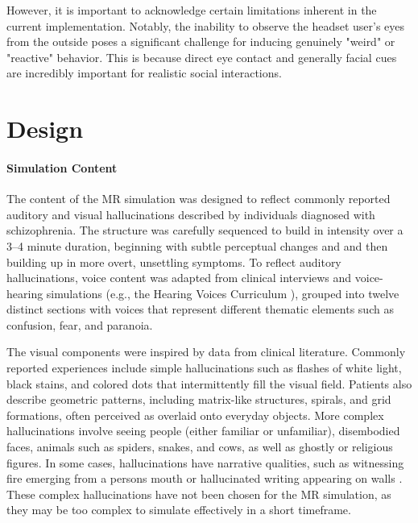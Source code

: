 However, it is important to acknowledge certain limitations inherent in the current implementation. Notably, the inability to observe the headset user's eyes from the outside poses a significant challenge for inducing genuinely "weird" or "reactive" behavior. This is because direct eye contact and generally facial cues are incredibly important for realistic social interactions.

\section{Design}

\paragraph{Simulation Content} The content of the MR simulation was designed to reflect commonly reported auditory and visual hallucinations described by individuals diagnosed with schizophrenia. The structure was carefully sequenced to build in intensity over a 3--4 minute duration, beginning with subtle perceptual changes and and then building up in more overt, unsettling symptoms. To reflect auditory hallucinations, voice content was adapted from clinical interviews and voice-hearing simulations (e.g., the Hearing Voices Curriculum \cite{Chaffin2013}), grouped into twelve distinct sections with voices that represent different thematic elements such as confusion, fear, and paranoia.

\vspace{1em}

The visual components were inspired by data from clinical literature. Commonly reported experiences include simple hallucinations such as flashes of white light, black stains, and colored dots that intermittently fill the visual field. Patients also describe geometric patterns, including matrix-like structures, spirals, and grid formations, often perceived as overlaid onto everyday objects. More complex hallucinations involve seeing people (either familiar or unfamiliar), disembodied faces, animals such as spiders, snakes, and cows, as well as ghostly or religious figures. In some cases, hallucinations have narrative qualities, such as witnessing fire emerging from a persons mouth or hallucinated writing appearing on walls \cite{Vanommen2019,Silverstein2021}. These complex hallucinations have not been chosen for the MR simulation, as they may be too complex to simulate effectively in a short timeframe.

\vspace{1em}

